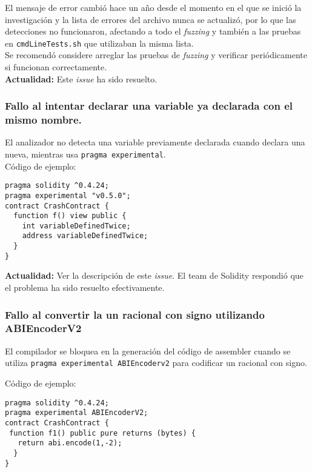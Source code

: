 El mensaje de error cambió hace un año desde el momento en el que se inició la investigación y la lista de errores del archivo nunca se actualizó, por lo que las detecciones no funcionaron, afectando a todo el \textit{fuzzing} y también a las pruebas en \texttt{cmdLineTests.sh}\cite{GHcmdlinetests} que utilizaban la misma lista.\\

Se recomendó considere arreglar las pruebas de \textit{fuzzing} y verificar periódicamente si funcionan correctamente.\\

\textbf{Actualidad:} Este \textit{issue}\cite{GHI4458} ha sido resuelto\cite{GHPR4461}.\\


\subsubsection{Fallo al intentar declarar una variable ya declarada con el mismo nombre.}

El analizador no detecta una variable previamente declarada cuando declara una nueva, mientras usa \texttt{pragma experimental}.\\

Código de ejemplo:
\begin{lstlisting}[language=Solidity]
pragma solidity ^0.4.24;
pragma experimental "v0.5.0";
contract CrashContract {     
  function f() view public {
    int variableDefinedTwice;
    address variableDefinedTwice;
  }
}
\end{lstlisting}

\textbf{Actualidad:} Ver la descripción de este \textit{issue}\cite{GHI4705}. El team de Solidity respondió que el problema ha sido resuelto efectivamente.\\

\subsubsection{Fallo al convertir la un racional con signo utilizando ABIEncoderV2}

El compilador se bloquea en la generación del código de assembler cuando se utiliza \texttt{pragma experimental ABIEncoderv2} para codificar un racional con signo.

Código de ejemplo:
\begin{lstlisting}[language=Solidity]
pragma solidity ^0.4.24;
pragma experimental ABIEncoderV2;
contract CrashContract {
 function f1() public pure returns (bytes) {
   return abi.encode(1,-2);
  }
}
\end{lstlisting}

